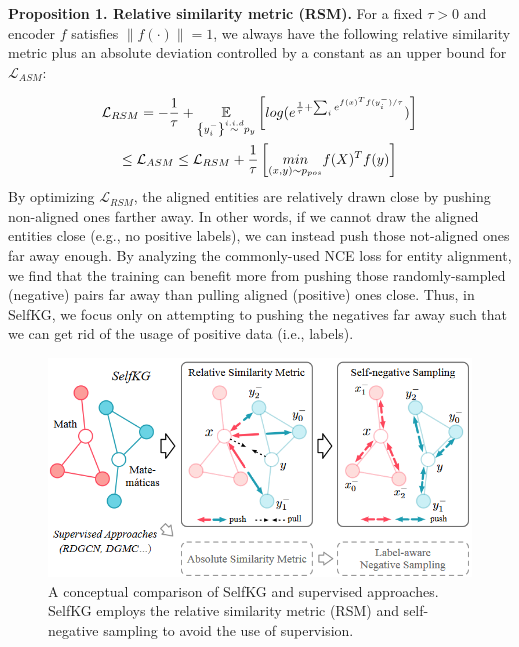 \documentclass[sigconf]{acmart}
\begin{document}
{\textbf{Proposition 1. Relative similarity metric (RSM).} For a fixed $\tau > 0$ and encoder $f$ satisfies $\left \| f(\cdot) \right \|=1  $, we always have the following relative similarity metric plus an absolute deviation controlled by a constant as an upper bound for $\mathcal{L}_{ASM}$:

\begin{gather}\label{eq2}
\mathcal{L}_{RSM}=-\frac{1}{\tau }+ \underset{\left \{y_i^{-}\right\}\overset{i.i.d}{\sim}p_y}{\mathbb{E}}\left[ log(e^{\frac{1}{\tau}+\sum_ie^{f(x)^Tf(y_i^{-})/\tau}}) \right] \notag\\
\le \mathcal{L}_{ASM} \le \mathcal{L}_{RSM} + \frac{1}{\tau}\left[ \underset{(x,y)\sim p_{pos}}{min}f(X)^Tf(y)  \right ]     
\end{gather}
By optimizing $\mathcal{L}_{RSM}$, the aligned entities are relatively drawn close by pushing non-aligned ones farther away. In other words, if we cannot draw the aligned entities close (e.g., no positive labels), we can instead push those not-aligned ones far away enough. By analyzing the commonly-used NCE loss for entity alignment, we find that the training can benefit more from pushing those randomly-sampled (negative) pairs far away than pulling aligned (positive) ones close. Thus, in SelfKG, we focus only on attempting to pushing the negatives far away such that we can get rid of the usage of positive data (i.e., labels).
\begin{figure}[h]
    \centering
    \includegraphics[width=1\linewidth]{figure/rsm.png}
    \caption{A conceptual comparison of SelfKG and supervised approaches. SelfKG employs the relative similarity metric (RSM) and self-negative sampling to avoid the use of supervision.}
    \label{rsm}
\end{figure}
}
\end{document}
